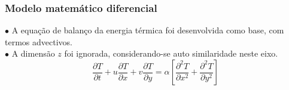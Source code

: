\documentclass[xcolor=dvipsnames,10pt,aspectratio=169]{beamer}
\begin{document}



	\begin{frame}
		\frametitle{Modelo matemático diferencial}
		$\bullet$ A equação de balanço da energia térmica foi desenvolvida como base, com termos advectivos.\\
		$\bullet$ A dimensão $z$ foi ignorada, considerando-se auto similaridade neste eixo.\\

		\begin{equation}
			\frac{\partial T}{\partial t} + u \frac{\partial T}{\partial x} + v \frac{\partial T}{\partial y} = \alpha \left[  \frac{\partial^2 T}{\partial x^2} + \frac{\partial^2 T}{\partial y^2}   \right]
		\end{equation}

	\end{frame}
\end{document}
